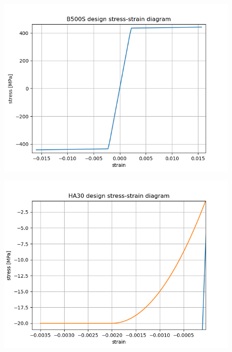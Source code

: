 \begin{center}
\includegraphics[width=120mm]{results/graphics/sections/B500S_design_stress_strain_diagram}
\end{center}
\begin{center}
\includegraphics[width=120mm]{results/graphics/sections/HA30_design_stress_strain_diagram}
\end{center}
\newpage

